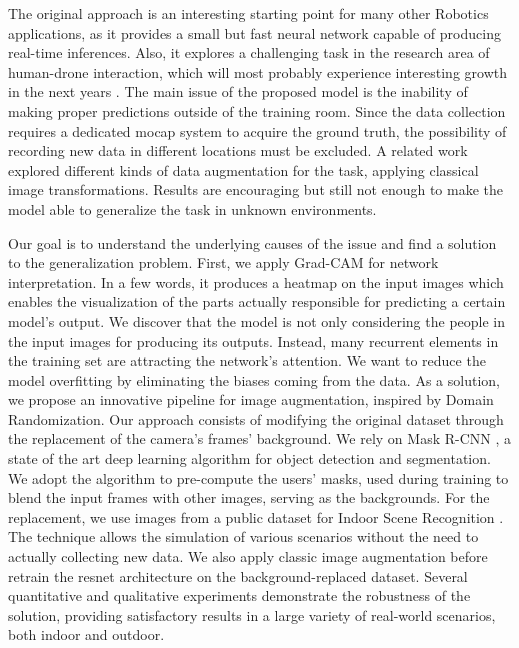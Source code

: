 The original approach is an interesting starting point for many other Robotics applications, as it provides a small but fast neural network capable of producing real-time inferences. Also, it explores a challenging task in the research area of human-drone interaction, which will most probably experience interesting growth in the next years \cite{human-drone-sota}. The main issue of the proposed model is the inability of making proper predictions outside of the training room. Since the data collection requires a dedicated \gls{mocap} system to acquire the ground truth, the possibility of recording new data in different locations must be excluded. A related work \cite{zimmerman2020thesis} explored different kinds of data augmentation for the task, applying classical image transformations. Results are encouraging but still not enough to make the model able to generalize the task in unknown environments.

\medskip

Our goal is to understand the underlying causes of the issue and find a solution to the generalization problem. First, we apply Grad-CAM \cite{Selvaraju_2019} for network interpretation. In a few words, it produces a heatmap on the input images which enables the visualization of the parts actually responsible for predicting a certain model’s output. We discover that the model is not only considering the people in the input images for producing its outputs. Instead, many recurrent elements in the training set are attracting the network's attention. We want to reduce the model overfitting by eliminating the biases coming from the data. As a solution, we propose an innovative pipeline for image augmentation, inspired by Domain Randomization. Our approach consists of modifying the original dataset through the replacement of the camera's frames' background. We rely on Mask R-CNN \cite{he2018mask}, a state of the art deep learning algorithm for object detection and segmentation. We adopt the algorithm to pre-compute the users' masks, used during training to blend the input frames with other images, serving as the backgrounds. For the replacement, we use images from a public dataset for Indoor Scene Recognition \cite{cvpr09}. The technique allows the simulation of various scenarios without the need to actually collecting new data. We also apply classic image augmentation before retrain the \gls{resnet} architecture on the background-replaced dataset. Several quantitative and qualitative experiments demonstrate the robustness of the solution, providing satisfactory results in a large variety of real-world scenarios, both indoor and outdoor.

